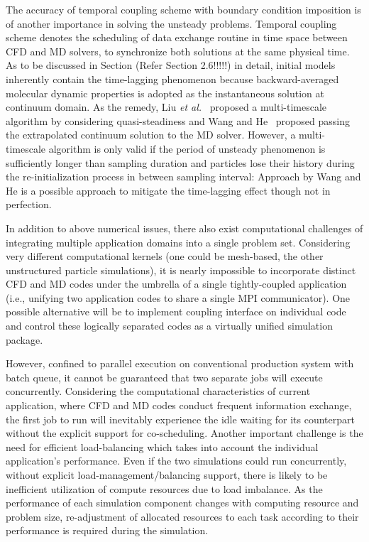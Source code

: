 \documentclass[preprint,12pt]{elsarticle}
\begin{document}
The accuracy of temporal coupling scheme with boundary condition imposition is of another importance in solving the unsteady problems. Temporal coupling scheme denotes the scheduling of data exchange routine in time space between CFD and MD solvers, to synchronize both solutions at the same physical time. As to be discussed in Section (Refer Section 2.6!!!!!) in detail, initial models inherently contain the time-lagging phenomenon because backward-averaged molecular dynamic properties 
is adopted as the instantaneous solution at continuum domain. As the remedy, Liu {\it{et al.}}~\cite{Liu} proposed a multi-timescale algorithm by considering quasi-steadiness and Wang and He~\cite{Wang} proposed passing the extrapolated continuum solution to the MD solver. However, a multi-timescale algorithm is only valid if the period of unsteady phenomenon is sufficiently longer than sampling duration and particles lose their history during the re-initialization process in between sampling interval: Approach by Wang and He is a possible approach to mitigate the time-lagging effect though not in perfection.


In addition to above numerical issues, there also exist computational challenges of integrating multiple application domains into a single problem set. Considering very different computational kernels (one could be mesh-based, the other unstructured particle simulations), it is nearly impossible to incorporate distinct CFD and MD codes under the umbrella of a single tightly-coupled application (i.e., unifying two application codes to share a single MPI communicator). One possible alternative will be to implement coupling interface on individual code and control these logically separated codes as a virtually unified simulation package.

However, confined to parallel execution on conventional production system with batch queue, it cannot be guaranteed that two separate jobs will execute concurrently. Considering the computational characteristics of current application, where CFD and MD codes conduct frequent information exchange, the first job to run will inevitably experience the idle waiting for its counterpart without the explicit support for co-scheduling. Another important challenge is the need for efficient load-balancing which takes into account the individual application's performance. Even if the two simulations could run concurrently, without explicit load-management/balancing support, there is likely to be inefficient utilization of compute resources due to load imbalance. As the performance of each simulation component changes with computing resource and problem size, re-adjustment of allocated resources to each task according to their performance is required during the simulation.
\end{document}
